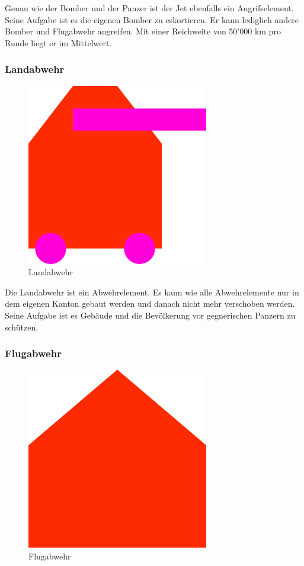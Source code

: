 \documentclass[ngerman, 12pt, pdftex]{scrartcl}[2006/07/30]
\begin{document}
Genau wie der Bomber und der Panzer ist der Jet ebenfalls ein Angrifselement.
Seine Aufgabe ist es die eigenen Bomber zu eskortieren. Er kann lediglich andere Bomber und Flugabwehr angreifen. Mit einer Reichweite von 50'000 km pro Runde liegt er im Mittelwert.

\subsubsection{Landabwehr}

\begin{figure}[h]
\centering
\includegraphics[scale=18]{spiel/Landabwehr.png}
\caption{Landabwehr}
\end{figure}

Die Landabwehr ist ein Abwehrelement. Es kann wie alle Abwehrelemente nur in dem eigenen Kanton gebaut werden und danach nicht mehr verschoben werden. Seine Aufgabe ist es Gebäude und die Bevölkerung vor gegnerischen Panzern zu schützen.


\newpage

\subsubsection{Flugabwehr}

\begin{figure}[h]
\centering
\includegraphics[scale=18]{spiel/Flugabwehr.png}
\caption{Flugabwehr}
\end{figure}
\end{document}
